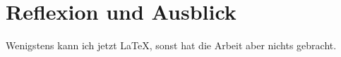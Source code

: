 \section{Reflexion und Ausblick}
Wenigstens kann ich jetzt \LaTeX, sonst hat die Arbeit aber nichts gebracht.
\label{sec:refl-und-ausbl}
